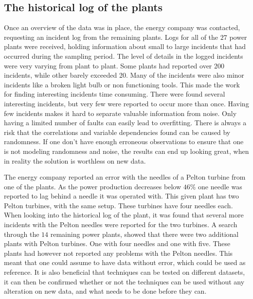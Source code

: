     \subsection{The historical log of the plants }
        Once an overview of the data was in place, the energy company was contacted, requesting an incident log from the remaining plants. Logs for all of the $27$ power plants were received, holding information about small to large incidents that had occurred during the sampling period. The level of details in the logged incidents were very varying from plant to plant. Some plants had reported over 200 incidents, while other barely exceeded 20. Many of the incidents were also minor incidents like a broken light bulb or non functioning tools. This made the work for finding interesting incidents time consuming. There were found several interesting incidents, but very few were reported to occur more than once. Having few incidents makes it hard to separate valuable information from noise. Only having a limited number of faults can easily lead to overfitting. There is always a risk that the correlations and variable dependencies found can be caused by randomness. If one don't have enough erroneous observations to ensure that one is not modeling randomness and noise, the results can end up looking great, when in reality the solution is worthless on new data. 
        
        The energy company reported an error with the needles of a Pelton turbine from one of the plants. As the power production decreases below $46\%$ one needle was reported to lag behind a needle it was operated with. This given plant has two Pelton turbines, with the same setup.  These turbines have four needles each. When looking into the historical log of the plant, it was found that several more incidents with the Pelton needles were reported for the two turbines. A search through the $14$ remaining power plants, showed that there were two additional plants with Pelton turbines. One with four needles and one with five. These plants had however not reported any problems with the Pelton needles. This meant that one could assume to have data without error, which could be used as reference. It is also beneficial that techniques can be tested on different datasets, it can then be confirmed whether or not the techniques can be used without any alteration on new data, and what needs to be done before they can. 
        
